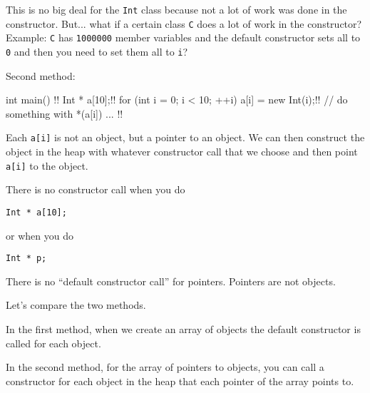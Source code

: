 This is no big deal for the \texttt{Int} class because not a lot of work
was done in the constructor. But... what if a certain class \texttt{C}
does a lot of work in the constructor? Example: \texttt{C} has
\texttt{1000000} member variables and the default constructor sets all to
\texttt{0} and then you need to set them all to \texttt{i}?

Second method:
\begin{consolethree}[escapeinside=!!]
int main()
{   !!
    Int * a[10];!! 
    for (int i = 0; i < 10; ++i)
        a[i] = new Int(i);!!
    // do something with *(a[i])
    ... !!
}
\end{consolethree}

 Each \texttt{a[i]} is not an object, but a pointer
to an object. We can then construct the object in the heap with whatever
constructor call that we choose and then point \texttt{a[i]} to the
object.

There is no constructor call when you do
\begin{center}
\texttt{Int * a[10];}
\end{center}
or when you do
\begin{center}
\texttt{Int * p;}
\end{center}
 There is no ``default constructor call'' for
pointers. Pointers are not objects.

Let's compare the two methods.

In the first method, when we create an array of objects the default
constructor is called for each object.

In the second method, for the array of pointers to objects, you can call
a constructor for each object in the heap that each pointer of the array
points to.

